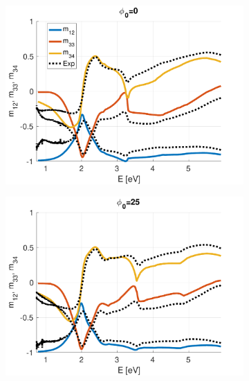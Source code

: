 \begin{figure}[h!]
   \begin{subfigure}{0.49\linewidth}
        \centering
        \includegraphics[width=\linewidth, trim= 0cm 0cm 0cm 0cm, clip]{figures/ch4/S5A/S5A_NCS_phi0.pdf}
   \end{subfigure}
   \begin{subfigure}{0.49\linewidth}
        \centering
        \includegraphics[width=\linewidth, trim= 0cm 0cm 0cm 0cm, clip]{figures/ch4/S5A/S5A_NCS_phi25.pdf}
   \end{subfigure}
   

\end{figure}

